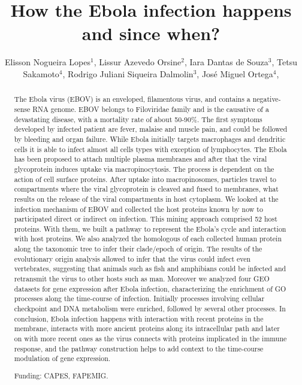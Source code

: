 \documentclass[twoside]{article}
\title{\vspace{-15mm}\fontsize{24pt}{10pt}\selectfont\textbf{ How the Ebola infection happens and since when? }} %
\author{ Elisson Nogueira Lopes$^{1}$, Lissur Azevedo Orsine$^{2}$, Iara Dantas de Souza$^{3}$, Tetsu Sakamoto$^{4}$, Rodrigo Juliani Siqueira Dalmolin$^{3}$, José Miguel Ortega$^{4}$, }
\affil{ 1 UFMG

2 Ufmg

3 UFRN

4 Universidade Federal de Minas Gerais. Laboratório de Biodados.

 }
\date{}
\begin{document}
  
  
  \maketitle %
  
  
  \thispagestyle{fancy} %
  
  
  \begin{abstract}
  The Ebola virus (EBOV) is an enveloped, filamentous virus, and contains a negative-sense RNA genome. EBOV belongs to Filoviridae family and is the causative of a devastating disease, with a mortality rate of about 50-90\%. The first symptoms developed by infected patient are fever, malaise and muscle pain, and could be followed by bleeding and organ failure. While Ebola initially targets macrophages and dendritic cells it is able to infect almost all cells types with exception of lymphocytes. The Ebola has been proposed to attach multiple plasma membranes and after that the viral glycoprotein induces uptake via macropinocytosis. The process is dependent on the action of cell surface proteins. After uptake into macropinosomes, particles travel to compartments where the viral glycoprotein is cleaved and fused to membranes, what results on the release of the viral compartments in host cytoplasm. We looked at the infection mechanism of EBOV and collected the host proteins known by now to participated direct or indirect on infection. This mining approach comprised 52 host proteins. With them, we built a pathway to represent the Ebola’s cycle and interaction with host proteins. We also analyzed the homologous of each collected human protein along the taxonomic tree to infer their clade/epoch of origin. The results of the evolutionary origin analysis allowed to infer that the virus could infect even vertebrates, suggesting that animals such as fish and amphibians could be infected and retransmit the virus to other hosts such as man. Moreover we analyzed four GEO datasets for gene expression after Ebola infection, characterizing the enrichment of GO processes along the time-course of infection. Initially processes involving cellular checkpoint and DNA metabolism were enriched, followed by several other processes. In conclusion, Ebola infection happens with interaction with recent proteins in the membrane, interacts with more ancient proteins along its intracellular path and later on with more recent ones as the virus connects with proteins implicated in the immune response, and the pathway construction helps to add context to the time-course modulation of gene expression.
  
  Funding: CAPES, FAPEMIG. \\ 
  \end{abstract}
  
\end{document}
